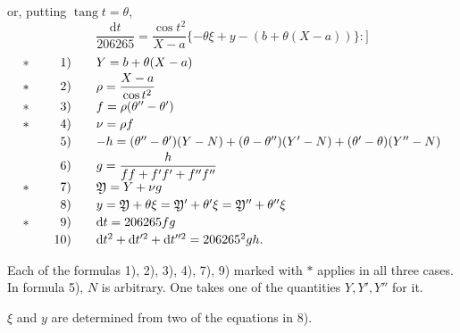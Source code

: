 \noindent or, putting \(\operatorname{tang}t=\theta\),
\[
 \frac{\mathrm{d}t}{206265}=\frac{\cos t^2}{X-a}
 \{-\theta\xi+y-(b+\theta(X-a))\} :]
\]
\[
\begin{array}{@{}c@{\qquad}r@{\qquad}l@{}}
 \ast&1)&Y=b+\theta(X-a)\\[2pt]
 \ast&2)&\rho=\dfrac{X-a}{\cos t^2}\\[4pt]
 \ast&3)&f=\rho(\theta''-\theta')\\[2pt]
 \ast&4)&\nu=\rho f\\[2pt]
 &5)&-h=(\theta''-\theta')(Y-N)+(\theta-\theta'')(Y'-N)+(\theta'-\theta)(Y''-N)\\[2pt]
 &6)&g=\dfrac{h}{ff+f'f'+f''f''}\\[4pt]
 \ast&7)&\mathfrak{Y}=Y+\nu g\\[2pt]
 &8)&y=\mathfrak{Y}+\theta\xi=\mathfrak{Y}'+\theta'\xi=\mathfrak{Y}''+\theta''\xi\\[2pt]
 \ast&9)&\mathrm{d}t=206265fg\\[2pt]
 &10)&\mathrm{d}t^2+\mathrm{d}t^{\prime 2}+\mathrm{d}t^{\prime\prime 2}=206265^2gh.
\end{array}
\]

Each of the formulas 1), 2), 3), 4), 7), 9) marked with \(\ast\) applies in all three cases. In formula 5), \(N\) is arbitrary. One takes one of the quantities \(Y,Y',Y''\) for it.

\(\xi\) and \(y\) are determined from two of the equations in 8).

\bigskip
{\centering
[5.]\par{}\par}
\medskip
[Let \(x,y\) be approximate values of the coordinates of the point to be determined, \(a_i,b_i\) the coordinates of the fixed points, and \(T_i\) the azimuths at these points reduced to the plane. If one puts
\[
 x-a_i=r_i\cos t_i,\qquad y-b_i=r_i\sin t_i
\]
\noindent and
\[
 -206265\,.\,\frac{y-b_i}{r_ir_i}=\alpha_i,\qquad
 206265\,.\,\frac{x-a_i}{r_ir_i}=\beta_i
\]
\[
 t_i-T_i=n_i,
\]

\par\clearpage
\noindent\null\hfill{\small\textbf{TRIGONOMETRIC POINT DETERMINATION.}}\hfill\makebox[0pt][r]{\fontsize{13}{16}\selectfont 229}\par\medskip

